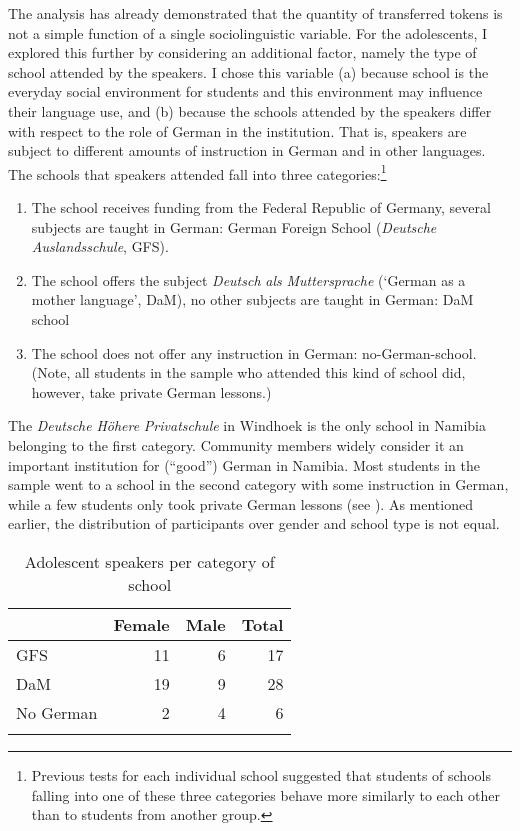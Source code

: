 \documentclass[output=paper]{langsci/langscibook}
\begin{document}
The analysis has already demonstrated that the quantity of transferred tokens is not a simple function of a single sociolinguistic variable.  For the adolescents, I explored this further by considering an additional factor, namely the type of school attended by the speakers. I chose this variable (a) because school is the everyday social environment for students and this environment may influence their language use, and (b) because the schools attended by the speakers differ with respect to the role of German in the institution. That is, speakers are subject to different amounts of instruction in German and in other languages. The schools that speakers attended fall into three categories:\footnote{Previous tests for each individual school suggested that students of schools falling into one of these three categories behave more similarly to each other than to students from another group.}

  
\begin{enumerate}   
	\item The school receives funding from the Federal Republic of Germany, several subjects are taught in German: German Foreign School (\textit{Deutsche} \textit{Auslandsschule}, GFS).
  	
	\item The school offers the subject \textit{Deutsch} \textit{als} \textit{Muttersprache} (‘German as a mother language’, DaM), no other subjects are taught in German: DaM school
    
	\item The school does not offer any instruction in German: no-German-school. (Note, all students in the sample who attended this kind of school did, however, take private German lessons.)
 \end{enumerate}

The \textit{Deutsche} \textit{Höhere} \textit{Privatschule} in Windhoek is the only school in Namibia belonging to the first category. Community members widely consider it an important institution for (“good”) German in Namibia. Most students in the sample went to a school in the second category with some instruction in German, while a few students only took private German lessons (see ). As mentioned earlier, the distribution of participants over gender and school type is not equal.

  

  
\begin{table}  
\begin{tabular}{lrrr}
\lsptoprule
      & \multicolumn{1}{c}{Female} & \multicolumn{1}{c}{Male} & \multicolumn{1}{c}{Total}\\
\midrule
{GFS} & {11} & {6} & {17}\\
{DaM} & {19} & {9} & {28}\\
{No German} & {2} & {4} & {6}\\
\lspbottomrule
\end{tabular}
\caption{Adolescent speakers per category of school\label{tab:bracke:6}}
\end{table}
\end{document}
